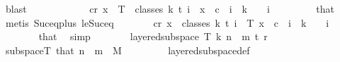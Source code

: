 \begin{isabellebody}
\ blast\isanewline
\ \ \ \ \isamarkupfalse%
\isanewline
\ \ \ \ \isamarkupfalse%
\ \isamarkupfalse%
\ {\isachardoublequoteopen}{\isasymexists}c{\isacharless}{\kern0pt}r{\isachardot}{\kern0pt}\ {\isasymforall}x\ {\isasymin}\ T\ {\isacharbackquote}{\kern0pt}\ classes\ {\isacharparenleft}{\kern0pt}k{\isacharplus}{\kern0pt}{}{\isacharparenright}{\kern0pt}\ t\ i{\isachardot}{\kern0pt}\ {\isasymchi}\ x\ {\isacharequal}{\kern0pt}\ c{\isachardoublequoteclose}\ \ {\isachardoublequoteopen}i\ {\isasymle}\ k\ {\isacharplus}{\kern0pt}\ {}{\isachardoublequoteclose}\ \ i\ \isanewline
\ \ \ \ \ \ \isamarkupfalse%
\ that\ \isamarkupfalse%
\ {\isacharparenleft}{\kern0pt}metis\ Suc{\isacharunderscore}{\kern0pt}eq{\isacharunderscore}{\kern0pt}plus{}\ le{\isacharunderscore}{\kern0pt}Suc{\isacharunderscore}{\kern0pt}eq{\isacharparenright}{\kern0pt}\isanewline
\ \ \ \ \isamarkupfalse%
\ \isamarkupfalse%
\ {\isachardoublequoteopen}{\isasymexists}c{\isacharless}{\kern0pt}r{\isachardot}{\kern0pt}\ {\isasymforall}x\ {\isasymin}\ classes\ {\isacharparenleft}{\kern0pt}k{\isacharplus}{\kern0pt}{}{\isacharparenright}{\kern0pt}\ t\ i{\isachardot}{\kern0pt}\ {\isasymchi}\ {\isacharparenleft}{\kern0pt}T\ x{\isacharparenright}{\kern0pt}\ {\isacharequal}{\kern0pt}\ c{\isachardoublequoteclose}\ \ {\isachardoublequoteopen}i\ {\isasymle}\ k\ {\isacharplus}{\kern0pt}\ {}{\isachardoublequoteclose}\ \ i\ \isanewline
\ \ \ \ \ \ \isamarkupfalse%
\ that\ \isamarkupfalse%
\ simp\isanewline
\ \ \ \ \isamarkupfalse%
\ \isamarkupfalse%
\ {\isachardoublequoteopen}layered{\isacharunderscore}{\kern0pt}subspace\ T\ {\isacharparenleft}{\kern0pt}k{\isacharplus}{\kern0pt}{}{\isacharparenright}{\kern0pt}\ {\isacharparenleft}{\kern0pt}n\ {\isacharplus}{\kern0pt}\ m{\isacharparenright}{\kern0pt}\ t\ r\ {\isasymchi}{\isachardoublequoteclose}\ \isamarkupfalse%
\ subspace{\isacharunderscore}{\kern0pt}T\ that{\isacharparenleft}{\kern0pt}{}{\isacharparenright}{\kern0pt}\ {\isacartoucheopen}n\ {\isacharplus}{\kern0pt}\ m\ {\isacharequal}{\kern0pt}\ M{\isacharprime}{\kern0pt}{\isacartoucheclose}\ \isanewline
\ \ \ \ \ \ \isamarkupfalse%
\ layered{\isacharunderscore}{\kern0pt}subspace{\isacharunderscore}{\kern0pt}def\ \isamarkupfalse%

\end{isabellebody}
